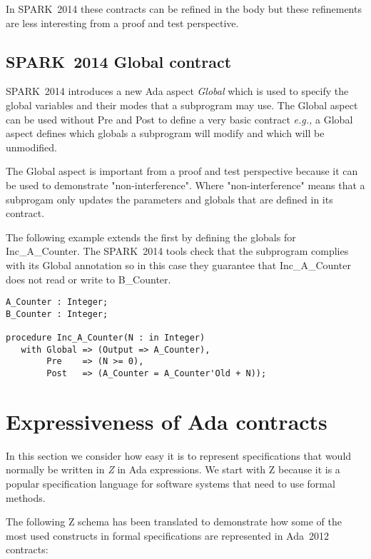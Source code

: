 \documentclass{llncs}
\newcommand{\newspark}{SPARK~2014\xspace}
\newcommand{\ada}{Ada\xspace}
\newcommand{\adatwtw}{Ada~2012\xspace}
\newcommand{\eg}{\textit{e.g.,}\xspace}
\begin{document}
In \newspark these contracts can be refined in the body but these refinements are less interesting from a proof and test perspective.

\subsection{\newspark Global contract}

\newspark introduces a new \ada aspect \emph{Global} which is used to specify the global variables and their modes that a subprogram may use. The Global aspect can be used without Pre and Post to define a very basic contract \eg a Global aspect defines which globals a subprogram will modify and which will be unmodified.

The Global aspect is important from a proof and test perspective because it can be used to demonstrate "non-interference". Where "non-interference" means that a subprogam only updates the parameters and globals that are defined in its contract.

The following example extends the first by defining the globals for Inc\_A\_Counter. The \newspark tools check that the subprogram complies with its Global annotation so in this case they guarantee that Inc\_A\_Counter does not read or write to B\_Counter.

\begin{lstlisting}
A_Counter : Integer;
B_Counter : Integer;

procedure Inc_A_Counter(N : in Integer)
   with Global => (Output => A_Counter),
        Pre    => (N >= 0),
        Post   => (A_Counter = A_Counter'Old + N));

\end{lstlisting}


\section{Expressiveness of Ada contracts}

In this section we consider how easy it is to represent specifications that would normally be written in \emph{Z} in Ada expressions. We start with Z because it is a popular specification language for software systems that need to use formal methods.

The following Z schema has been translated to demonstrate how some of the most used constructs in formal specifications are represented in \adatwtw contracts:
\end{document}
